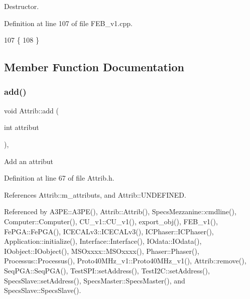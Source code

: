 Destructor. 



Definition at line 107 of file F\+E\+B\+\_\+v1.\+cpp.


\begin{DoxyCode}
107                 \{
108 \}
\end{DoxyCode}


\subsection{Member Function Documentation}
\mbox{\label{classAttrib_a235f773af19c900264a190b00a3b4ad7}} 
\subsubsection{\texorpdfstring{add()}{add()}}
{\footnotesize\ttfamily void Attrib\+::add (\begin{DoxyParamCaption}\item[{int}]{attribut }\end{DoxyParamCaption})\hspace{0.3cm}{\ttfamily [inline]}, {\ttfamily [inherited]}}

Add an attribut 

Definition at line 67 of file Attrib.\+h.



References Attrib\+::m\+\_\+attributs, and Attrib\+::\+U\+N\+D\+E\+F\+I\+N\+ED.



Referenced by A3\+P\+E\+::\+A3\+P\+E(), Attrib\+::\+Attrib(), Specs\+Mezzanine\+::cmdline(), Computer\+::\+Computer(), C\+U\+\_\+v1\+::\+C\+U\+\_\+v1(), export\+\_\+obj(), F\+E\+B\+\_\+v1(), Fe\+P\+G\+A\+::\+Fe\+P\+G\+A(), I\+C\+E\+C\+A\+Lv3\+::\+I\+C\+E\+C\+A\+Lv3(), I\+C\+Phaser\+::\+I\+C\+Phaser(), Application\+::initialize(), Interface\+::\+Interface(), I\+Odata\+::\+I\+Odata(), I\+Oobject\+::\+I\+Oobject(), M\+S\+Oxxxx\+::\+M\+S\+Oxxxx(), Phaser\+::\+Phaser(), Processus\+::\+Processus(), Proto40\+M\+Hz\+\_\+v1\+::\+Proto40\+M\+Hz\+\_\+v1(), Attrib\+::remove(), Seq\+P\+G\+A\+::\+Seq\+P\+G\+A(), Test\+S\+P\+I\+::set\+Address(), Test\+I2\+C\+::set\+Address(), Specs\+Slave\+::set\+Address(), Specs\+Master\+::\+Specs\+Master(), and Specs\+Slave\+::\+Specs\+Slave().


